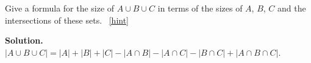 \documentclass{book}
\begin{document}
\setcounter{project}{219}
\addtocounter{project}{-1}
\begin{activity}[]\label{threesetintersection}
\hypertarget{p-1226}{}%
Give a formula for the size of \(A\cup B\cup C\) in terms of the sizes of \(A\), \(B\), \(C\) and the intersections of these sets.%
~\hfill{\tiny\hyperlink{a-219}{[hint]}\hypertarget{q-219}{}}\par\smallskip%
\noindent\textbf{Solution.}\hypertarget{solution-142}{}\quad%
\hypertarget{p-1228}{}%
\(|A\cup B\cup C|=|A|+|B|+|C|-|A\cap B|- |A\cap C| - |B\cap
C| +|A\cap B\cap C|\).%
\end{activity}
\end{document}
